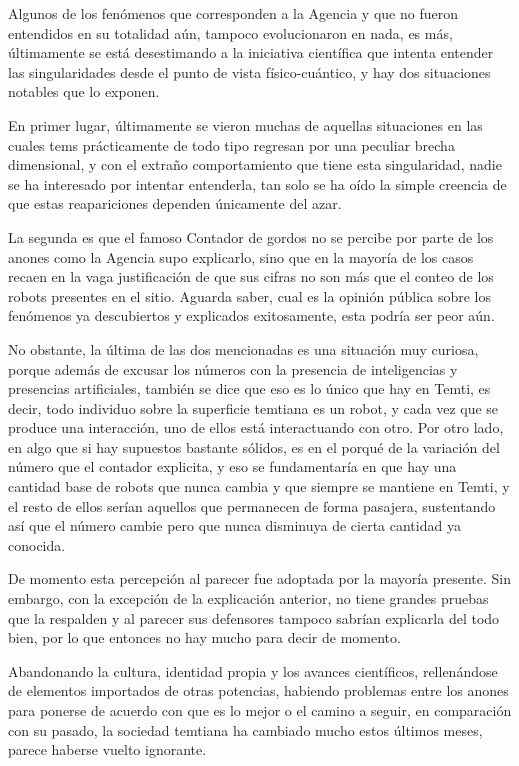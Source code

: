 \documentclass[
  spanish,
]{book}
\begin{document}
Algunos de los fenómenos que corresponden a la Agencia y que no fueron entendidos en su totalidad aún, tampoco evolucionaron en nada, es más, últimamente se está desestimando a la iniciativa científica que intenta entender las singularidades desde el punto de vista físico-cuántico, y hay dos situaciones notables que lo exponen.

En primer lugar, últimamente se vieron muchas de aquellas situaciones en las cuales tems prácticamente de todo tipo regresan por una peculiar brecha dimensional, y con el extraño comportamiento que tiene esta singularidad, nadie se ha interesado por intentar entenderla, tan solo se ha oído la simple creencia de que estas reapariciones dependen únicamente del azar.

La segunda es que el famoso Contador de gordos no se percibe por parte de los anones como la Agencia supo explicarlo, sino que en la mayoría de los casos recaen en la vaga justificación de que sus cifras no son más que el conteo de los robots presentes en el sitio. Aguarda saber, cual es la opinión pública sobre los fenómenos ya descubiertos y explicados exitosamente, esta podría ser peor aún.

No obstante, la última de las dos mencionadas es una situación muy curiosa, porque además de excusar los números con la presencia de inteligencias y presencias artificiales, también se dice que eso es lo único que hay en Temti, es decir, todo individuo sobre la superficie temtiana es un robot, y cada vez que se produce una interacción, uno de ellos está interactuando con otro. Por otro lado, en algo que si hay supuestos bastante sólidos, es en el porqué de la variación del número que el contador explicita, y eso se fundamentaría en que hay una cantidad base de robots que nunca cambia y que siempre se mantiene en Temti, y el resto de ellos serían aquellos que permanecen de forma pasajera, sustentando así que el número cambie pero que nunca disminuya de cierta cantidad ya conocida.

De momento esta percepción al parecer fue adoptada por la mayoría presente. Sin embargo, con la excepción de la explicación anterior, no tiene grandes pruebas que la respalden y al parecer sus defensores tampoco sabrían explicarla del todo bien, por lo que entonces no hay mucho para decir de momento.

Abandonando la cultura, identidad propia y los avances científicos, rellenándose de elementos importados de otras potencias, habiendo problemas entre los anones para ponerse de acuerdo con que es lo mejor o el camino a seguir, en comparación con su pasado, la sociedad temtiana ha cambiado mucho estos últimos meses, parece haberse vuelto ignorante.
\end{document}
